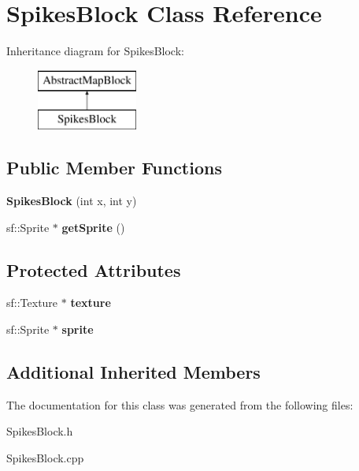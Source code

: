 \hypertarget{class_spikes_block}{}\section{Spikes\+Block Class Reference}
\label{class_spikes_block}
Inheritance diagram for Spikes\+Block\+:\begin{figure}[H]
\begin{center}
\leavevmode
\includegraphics[height=2.000000cm]{class_spikes_block}
\end{center}
\end{figure}
\subsection*{Public Member Functions}
\begin{DoxyCompactItemize}
\item 
\mbox{\label{class_spikes_block_ae1ae23307e042a765a02bcf208df00a6}} 
{\bfseries Spikes\+Block} (int x, int y)
\item 
\mbox{\label{class_spikes_block_a01ee14c5a7053180abfc6620fbe1e3cd}} 
sf\+::\+Sprite $\ast$ {\bfseries get\+Sprite} ()
\end{DoxyCompactItemize}
\subsection*{Protected Attributes}
\begin{DoxyCompactItemize}
\item 
\mbox{\label{class_spikes_block_a0280cf45f757b2bf74f06394d7c51d28}} 
sf\+::\+Texture $\ast$ {\bfseries texture}
\item 
\mbox{\label{class_spikes_block_af553d7cee5570d44b0352a583e348a77}} 
sf\+::\+Sprite $\ast$ {\bfseries sprite}
\end{DoxyCompactItemize}
\subsection*{Additional Inherited Members}


The documentation for this class was generated from the following files\+:\begin{DoxyCompactItemize}
\item 
Spikes\+Block.\+h\item 
Spikes\+Block.\+cpp\end{DoxyCompactItemize}
